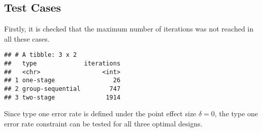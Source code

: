 \documentclass[
]{book}
\newenvironment{Shaded}{\begin{snugshade}}{\end{snugshade}}
\newcommand{\DataTypeTok}[1]{\textcolor[rgb]{0.13,0.29,0.53}{#1}}
\newcommand{\KeywordTok}[1]{\textcolor[rgb]{0.13,0.29,0.53}{\textbf{#1}}}
\newcommand{\NormalTok}[1]{#1}
\newcommand{\OperatorTok}[1]{\textcolor[rgb]{0.81,0.36,0.00}{\textbf{#1}}}
\newcommand{\StringTok}[1]{\textcolor[rgb]{0.31,0.60,0.02}{#1}}
\begin{document}
\hypertarget{test-cases-3}{%
\subsection{Test Cases}\label{test-cases-3}}

Firstly, it is checked that the maximum number of iterations was not reached
in all these cases.

\begin{Shaded}
\end{Shaded}

\begin{verbatim}
## # A tibble: 3 x 2
##   type             iterations
##   <chr>                 <int>
## 1 one-stage                26
## 2 group-sequential        747
## 3 two-stage              1914
\end{verbatim}

Since type one error rate is defined under the point effect size \(\delta=0\),
the type one error rate constraint can be tested for all three optimal designs.
\end{document}
